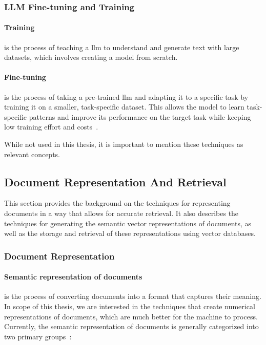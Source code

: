 \subsubsection{LLM Fine-tuning and Training}

\paragraph{Training} is the process of teaching a \gls{llm} to understand and
generate text with large datasets, which involves creating a model from scratch.

\paragraph{Fine-tuning} is the process of taking a pre-trained \gls{llm} and
adapting it to a specific task by training it on a smaller, task-specific
dataset. This allows the model to learn task-specific patterns and improve its
performance on the target task while keeping low training effort and
costs~\cite{zhao2023}.

While not used in this thesis, it is important to mention these techniques as
relevant concepts.

\subsection{Document Representation And Retrieval}

This section provides the background on the techniques for representing
documents in a way that allows for accurate retrieval. It also describes the
techniques for generating the semantic vector representations of documents, as
well as the storage and retrieval of these representations using vector
databases.

\subsubsection{Document Representation}\label{emb:semvec}

\paragraph{Semantic representation of documents} is the process of converting
documents into a format that captures their meaning. In scope of this thesis, we
are interested in the techniques that create numerical representations of
documents, which are much better for the machine to process. Currently, the
semantic representation of documents is generally categorized into two primary
groups~\cite{khan2026retrieval}:

